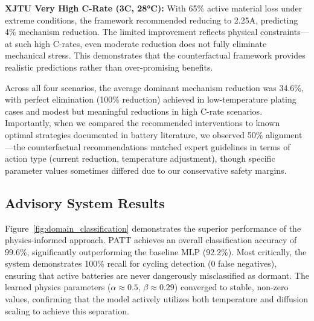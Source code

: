\documentclass[5p,times,authoryear]{elsarticle}
\begin{document}
\textbf{XJTU Very High C-Rate (3C, 28°C):} With 65\% active material loss under extreme conditions, the framework recommended reducing to 2.25A, predicting 4\% mechanism reduction. The limited improvement reflects physical constraints---at such high C-rates, even moderate reduction does not fully eliminate mechanical stress. This demonstrates that the counterfactual framework provides realistic predictions rather than over-promising benefits.

Across all four scenarios, the average dominant mechanism reduction was 34.6\%, with perfect elimination (100\% reduction) achieved in low-temperature plating cases and modest but meaningful reductions in high C-rate scenarios. Importantly, when we compared the recommended interventions to known optimal strategies documented in battery literature, we observed 50\% alignment---the counterfactual recommendations matched expert guidelines in terms of action type (current reduction, temperature adjustment), though specific parameter values sometimes differed due to our conservative safety margins.



\subsection{Advisory System Results}

Figure~\ref{fig:domain_classification} demonstrates the superior performance of the physics-informed approach. PATT achieves an overall classification accuracy of 99.6\%, significantly outperforming the baseline MLP (92.2\%). Most critically, the system demonstrates 100\% recall for cycling detection (0 false negatives), ensuring that active batteries are never dangerously misclassified as dormant. The learned physics parameters ($\alpha \approx 0.5$, $\beta \approx 0.29$) converged to stable, non-zero values, confirming that the model actively utilizes both temperature and diffusion scaling to achieve this separation.
\end{document}
